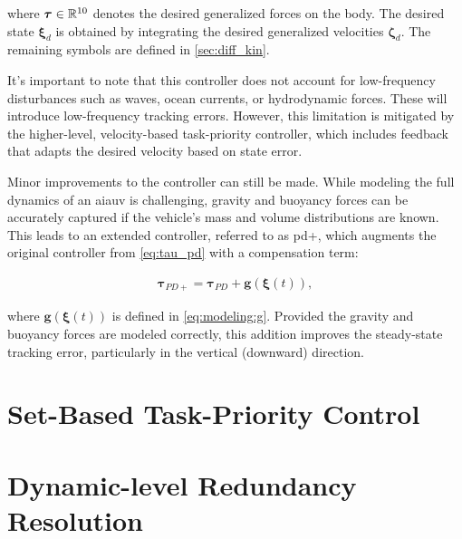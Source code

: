 where \(\bm{\tau} \in \mathbb{R}^{10}\) denotes the desired generalized forces on the body. The desired state \(\bm{\xi}_d\) is obtained by integrating the desired generalized velocities \(\bm{\zeta}_d\). The remaining symbols are defined in \autoref{sec:diff_kin}.

It's important to note that this controller does not account for low-frequency disturbances such as waves, ocean currents, or hydrodynamic forces. These will introduce low-frequency tracking errors. However, this limitation is mitigated by the higher-level, velocity-based task-priority controller, which includes feedback that adapts the desired velocity based on state error.

Minor improvements to the controller can still be made. While modeling the full dynamics of an \gls{aiauv} is challenging, gravity and buoyancy forces can be accurately captured if the vehicle’s mass and volume distributions are known. This leads to an extended controller, referred to as \gls{pd}+, which augments the original controller from \autoref{eq:tau_pd} with a compensation term:

\begin{align}
    \bm{\tau}_{PD+} = \bm{\tau}_{PD} + \bm{g}(\bm{\xi}(t)),
\end{align}

where \(\bm{g}(\bm{\xi}(t))\) is defined in \autoref{eq:modeling:g}. Provided the gravity and buoyancy forces are modeled correctly, this addition improves the steady-state tracking error, particularly in the vertical (downward) direction.

\section{Set-Based Task-Priority Control}

\section{Dynamic-level Redundancy Resolution}
\label{sec:tpc:dynamic_level}

